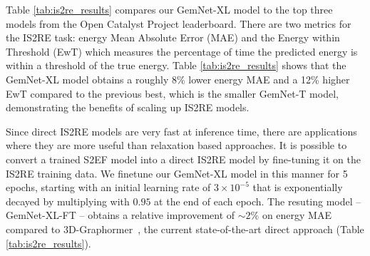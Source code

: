 \documentclass{article} \usepackage{iclr2022_conference,times}
\begin{document}
Table \ref{tab:is2re_results} compares our GemNet-XL model to the top three models from the Open Catalyst Project leaderboard. There are two metrics for the IS2RE task: energy Mean Absolute Error (MAE) and the Energy within Threshold (EwT) which measures the percentage of time the predicted energy is within a threshold of the true energy. Table \ref{tab:is2re_results} shows that the GemNet-XL model obtains a roughly 8\% lower energy MAE and a 12\% higher EwT compared to the previous best, which is the smaller GemNet-T model, demonstrating the benefits of scaling up IS2RE models.

Since direct IS2RE models are very fast at inference time, there are applications where they are more useful than relaxation based approaches.
It is possible to convert a trained S2EF model into a direct IS2RE model by fine-tuning it on the IS2RE training data. We finetune our GemNet-XL model in this manner for 5 epochs, starting with an initial learning rate of $3\times10^{-5}$ that is exponentially decayed by multiplying with $0.95$ at the end of each epoch. The resuting model -- GemNet-XL-FT -- obtains a relative improvement of ${\sim}2\%$ on energy MAE compared to
3D-Graphormer~\citep{graphormer}, the current state-of-the-art direct approach (Table \ref{tab:is2re_results}).




\begin{table*}[t]
    \centering
    \renewcommand{\arraystretch}{1.0}
    \setlength{\tabcolsep}{6pt}
    \caption{Model hyperparameters for the scaling analysis. ``\#GP GPUs'' denotes the number of GPUs over which the graph is distributed over for pure graph parallel training on a single node. ``\#GP+DP GPUs'' denotes the total number of GPUs used to train with graph parallel training together with 32-way data parallel training.}
    \label{tab:scaling_models}
    \vspace{-14pt}
\end{table*}
\end{document}
